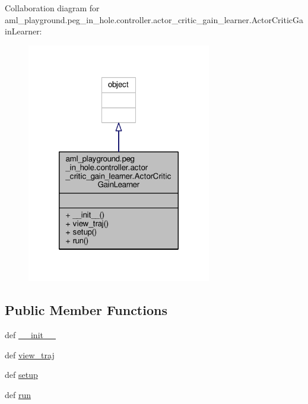 Collaboration diagram for aml\-\_\-playground.\-peg\-\_\-in\-\_\-hole.\-controller.\-actor\-\_\-critic\-\_\-gain\-\_\-learner.\-Actor\-Critic\-Gain\-Learner\-:
\nopagebreak
\begin{figure}[H]
\begin{center}
\leavevmode
\includegraphics[width=228pt]{classaml__playground_1_1peg__in__hole_1_1controller_1_1actor__critic__gain__learner_1_1_actor_critic_gain_learner__coll__graph}
\end{center}
\end{figure}
\subsection*{Public Member Functions}
\begin{DoxyCompactItemize}
\item 
def \hyperlink{classaml__playground_1_1peg__in__hole_1_1controller_1_1actor__critic__gain__learner_1_1_actor_critic_gain_learner_a69a85888d2f5cb4342d157005422495e}{\-\_\-\-\_\-init\-\_\-\-\_\-}
\item 
def \hyperlink{classaml__playground_1_1peg__in__hole_1_1controller_1_1actor__critic__gain__learner_1_1_actor_critic_gain_learner_a044f733d646d3cfc95cfcafaaa8b6f30}{view\-\_\-traj}
\item 
def \hyperlink{classaml__playground_1_1peg__in__hole_1_1controller_1_1actor__critic__gain__learner_1_1_actor_critic_gain_learner_aeff8a35775d39d58c772ce35242601bb}{setup}
\item 
def \hyperlink{classaml__playground_1_1peg__in__hole_1_1controller_1_1actor__critic__gain__learner_1_1_actor_critic_gain_learner_affead1a4a154401edf940588597f06af}{run}
\end{DoxyCompactItemize}


